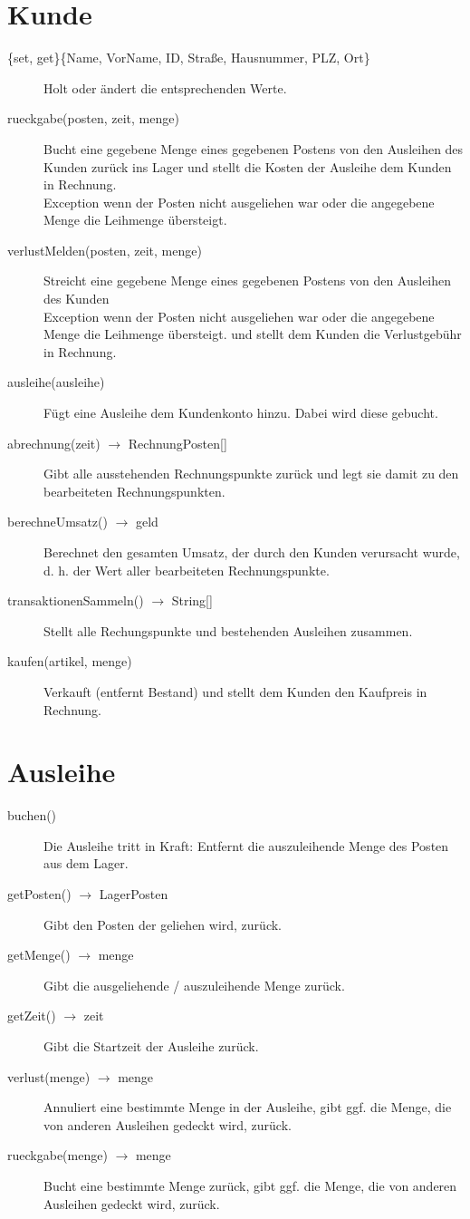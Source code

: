 \documentclass[a4paper,12pt,titlepage]{article}
\begin{document}
\section{Kunde}
\begin{description}
\item[\{set, get\}\{Name, VorName, ID, Straße, Hausnummer, PLZ, Ort\}]
Holt oder ändert die entsprechenden Werte.
\item[rueckgabe(posten, zeit, menge)]
Bucht eine gegebene Menge eines gegebenen Postens von den Ausleihen des Kunden zurück ins Lager
und stellt die Kosten der Ausleihe dem Kunden in Rechnung.\\
Exception wenn der Posten nicht ausgeliehen war oder die angegebene Menge die Leihmenge übersteigt.
\item[verlustMelden(posten, zeit, menge)]
Streicht eine gegebene Menge eines gegebenen Postens von den Ausleihen des Kunden\\
Exception wenn der Posten nicht ausgeliehen war oder die angegebene Menge die Leihmenge übersteigt.
und stellt dem Kunden die Verlustgebühr in Rechnung.
\item[ausleihe(ausleihe)]
Fügt eine Ausleihe dem Kundenkonto hinzu. Dabei wird diese gebucht.
\item[abrechnung(zeit) $\rightarrow$ RechnungPosten{[]}]
Gibt alle ausstehenden Rechnungspunkte zurück und legt sie damit zu den bearbeiteten Rechnungspunkten.
\item[berechneUmsatz() $\rightarrow$ geld]
Berechnet den gesamten Umsatz, der durch den Kunden verursacht wurde, d. h. der Wert aller bearbeiteten Rechnungspunkte.
\item[transaktionenSammeln() $\rightarrow$ String{[]}]
Stellt alle Rechungspunkte und bestehenden Ausleihen zusammen.
\item[kaufen(artikel, menge)]
Verkauft (entfernt Bestand) und stellt dem Kunden den Kaufpreis in Rechnung.
\end{description}
\section{Ausleihe}
\begin{description}
\item[buchen()]
Die Ausleihe tritt in Kraft: Entfernt die auszuleihende Menge des Posten aus dem Lager.
\item[getPosten() $\rightarrow$ LagerPosten]
Gibt den Posten der geliehen wird, zurück.
\item[getMenge() $\rightarrow$ menge]
Gibt die ausgeliehende / auszuleihende Menge zurück.
\item[getZeit() $\rightarrow$ zeit]
Gibt die Startzeit der Ausleihe zurück.
\item[verlust(menge) $\rightarrow$ menge]
Annuliert eine bestimmte Menge in der Ausleihe, gibt ggf. die Menge, die von anderen Ausleihen gedeckt wird, zurück.
\item[rueckgabe(menge) $\rightarrow$ menge]
Bucht eine bestimmte Menge zurück, gibt ggf. die Menge, die von anderen Ausleihen gedeckt wird, zurück.
\end{description}
\end{document}
